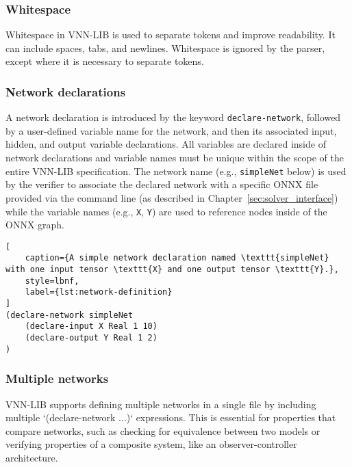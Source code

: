 \subsubsection*{Whitespace}
Whitespace in VNN-LIB is used to separate tokens and improve readability. It can include spaces, tabs, and newlines. Whitespace is ignored by the parser, except where it is necessary to separate tokens.

\subsubsection*{Network declarations}
\label{sec:network-declarations}
A network declaration is introduced by the keyword \texttt{declare-network}, followed by a user-defined variable name for the network, 
and then its associated input, hidden, and output variable declarations. All variables are declared inside of network declarations and variable 
names must be unique within the scope of the entire VNN-LIB specification.  The network name (e.g., \texttt{simpleNet} below) is used by the verifier to 
associate the declared network with a specific ONNX file provided via the command line (as described in Chapter~\ref{sec:solver_interface}) while the variable names 
(e.g., \texttt{X}, \texttt{Y}) are used to reference nodes inside of the ONNX graph.

\begin{lstlisting}[
    caption={A simple network declaration named \texttt{simpleNet} with one input tensor \texttt{X} and one output tensor \texttt{Y}.}, 
    style=lbnf,
    label={lst:network-definition}
]
(declare-network simpleNet
    (declare-input X Real 1 10)
    (declare-output Y Real 1 2)
) 
\end{lstlisting}


\subsubsection*{Multiple networks}
\label{sec:multi-network-declarations}
VNN-LIB supports defining multiple networks in a single file by including multiple `(declare-network ...)` expressions. This is essential for properties that compare networks, 
such as checking for equivalence between two models or verifying properties of a composite system, like an observer-controller architecture.

